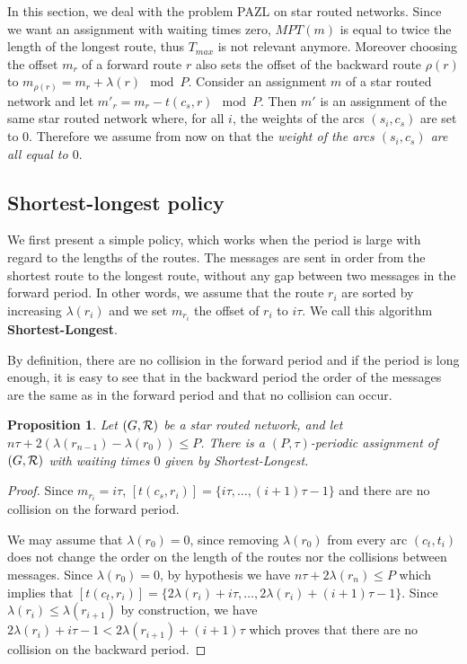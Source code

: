 \documentclass[10pt, conference, letterpaper]{IEEEtran}
\newtheorem{proposition}{Proposition}
\begin{document}
       In this section, we deal with the problem PAZL on star routed networks. Since we want an assignment with waiting times zero, $MPT(m)$ is equal to twice the length of the longest route, thus $T_{max}$ is not relevant anymore. Moreover choosing the offset $m_r$ of a forward route $r$ also sets the offset of the backward route $\rho(r)$ to $m_{\rho(r)} = m_{r} + \lambda(r) \mod P$.  Consider an assignment $m$ of a star routed network and let $m'_r= m_{r} - t(c_s,r) \mod P$. Then $m'$ is an assignment of the same star routed network where, for all $i$, the weights of the arcs $(s_i,c_s)$ are set to $0$. Therefore we assume from now on that the \emph{weight of the arcs $(s_i,c_s)$ are all equal to $0$}.
      
      
\subsection{Shortest-longest policy}
    

    We first present a simple policy, which works when the period is large with regard to the lengths of the routes.
    The messages are sent in order from the shortest route to the longest route, without any gap between two messages in the forward period.
    In other words, we assume that the route $r_i$ are sorted by increasing $\lambda(r_i)$ and we set $m_{r_i}$ the offset of $r_i$ to $i\tau$. We call this algorithm {\bf Shortest-Longest}.
      
     By definition, there are no collision in the forward period and if the period is long enough, 
     it is easy to see that in the backward period the order of the messages are the same as in the forward period and that no collision can occur. 
      
      
      \begin{proposition} Let $(G, {\cal R})$ be a star routed network, and let $n\tau + 2(\lambda(r_{n-1}) - \lambda(r_{0})) \leq P$. There is a $(P,\tau)$-periodic assignment of $(G, {\cal R})$ with waiting times $0$ given by Shortest-Longest.\label{prop:SL}
      \end{proposition}
      \begin{proof}
       Since $m_{r_i} = i\tau$, $[t(c_s,r_{i})] = \{i\tau,\dots, (i+1)\tau -1\}$ and there are no collision on the forward period.
       
       
       We may assume that $\lambda(r_{0}) = 0$, since removing $\lambda(r_{0})$ from every arc $(c_t,t_i)$ does not change the order on the length of the routes nor the collisions between messages.
       Since $\lambda(r_{0}) = 0$, by hypothesis we have $n\tau + 2\lambda(r_{n}) \leq P$ which implies that
       $[t(c_t,r_{i})] = \{2 \lambda(r_{i}) + i\tau, \dots,  2 \lambda(r_{i}) + (i+1)\tau -1\}$.
       Since $ \lambda(r_{i}) \leq  \lambda(r_{i+1})$ by construction, we have  $2 \lambda(r_{i}) + i\tau -1 < 2 \lambda(r_{i+1}) + (i+1)\tau$ which proves that there are no collision on the backward period. 
      \end{proof}
\end{document}
